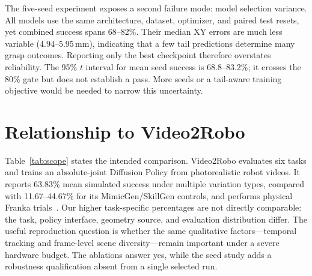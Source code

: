 \documentclass[10pt,twocolumn,letterpaper]{article}
\begin{document}
The five-seed experiment exposes a second failure mode: model selection variance.
All models use the same architecture, dataset, optimizer, and paired test resets,
yet combined success spans 68--82\%. Their median XY errors are much less variable
(4.94--5.95\,mm), indicating that a few tail predictions determine many grasp
outcomes. Reporting only the best checkpoint therefore overstates reliability.
The 95\% $t$ interval for mean seed success is 68.8--83.2\%; it crosses the 80\%
gate but does not establish a pass. More seeds or a tail-aware training objective
would be needed to narrow this uncertainty.

\section{Relationship to Video2Robo}
Table~\ref{tab:scope} states the intended comparison. Video2Robo evaluates six
tasks and trains an absolute-joint Diffusion Policy from photorealistic robot
videos. It reports 63.83\% mean simulated success under multiple variation types,
compared with 11.67--44.67\% for its MimicGen/SkillGen controls, and performs
physical Franka trials~\cite{mandlekar2023mimicgen,garrett2024skillgen}. Our
higher task-specific percentages are not directly
comparable: the task, policy interface, geometry source, and evaluation
distribution differ. The useful reproduction question is whether the same
qualitative factors---temporal tracking and frame-level scene diversity---remain
important under a severe hardware budget. The ablations answer yes, while the
seed study adds a robustness qualification absent from a single selected run.

\begin{table}[t]
\centering
\caption{Scope comparison. ``Ours'' is designed to diagnose a small-machine
reproduction and cannot support Video2Robo's physical-transfer claim.}
\label{tab:scope}
\setlength{\tabcolsep}{3.5pt}
\end{table}
\end{document}
